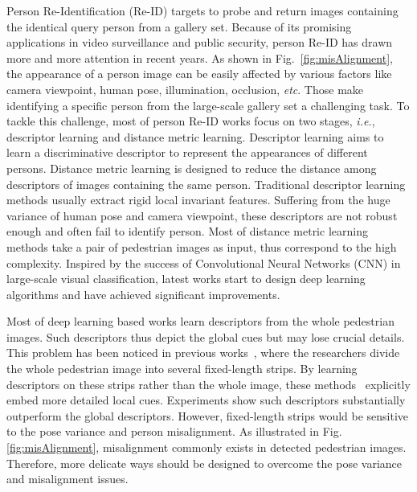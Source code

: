 \documentclass[sigconf]{acmart}
\begin{document}
Person Re-Identification (Re-ID) targets to probe and return images containing the identical query person from a gallery set. Because of its promising applications in video surveillance and public security, person Re-ID has drawn more and more attention in recent years. As shown in Fig.~\ref{fig:misAlignment}, the appearance of a person image can be easily affected by various factors like camera viewpoint, human pose, illumination, occlusion, \emph{etc}. Those make identifying a specific person from the large-scale gallery set a challenging task. To tackle this challenge, most of person Re-ID works focus on two stages, \emph{i.e.}, descriptor learning and distance metric learning. Descriptor learning aims to learn a discriminative descriptor to represent the appearances of different persons. Distance metric learning is designed to reduce the distance among descriptors of images containing the same person. Traditional descriptor learning methods usually extract rigid local invariant features. Suffering from the huge variance of human pose and camera viewpoint, these descriptors are not robust enough and often fail to identify person. Most of distance metric learning methods take a pair of pedestrian images as input, thus correspond to the high complexity. Inspired by the success of Convolutional Neural Networks (CNN) in large-scale visual classification, latest works start to design deep learning algorithms and have achieved significant improvements.

Most of deep learning based works learn descriptors from the whole pedestrian images. Such descriptors thus depict the global cues but may lose crucial details. This problem has been noticed in previous works~\cite{yi2014deep,wu2016enhanced,cheng2016person,hantao}, where the researchers divide the whole pedestrian image into several fixed-length strips. By learning descriptors on these strips rather than the whole image, these methods~\cite{yi2014deep,wu2016enhanced,cheng2016person,hantao} explicitly embed more detailed local cues. Experiments show such descriptors substantially outperform the global descriptors. However, fixed-length strips would be sensitive to the pose variance and person misalignment. As illustrated in Fig. \ref{fig:misAlignment}, misalignment commonly exists in detected pedestrian images. Therefore, more delicate ways should be designed to overcome the pose variance and misalignment issues.
\end{document}
